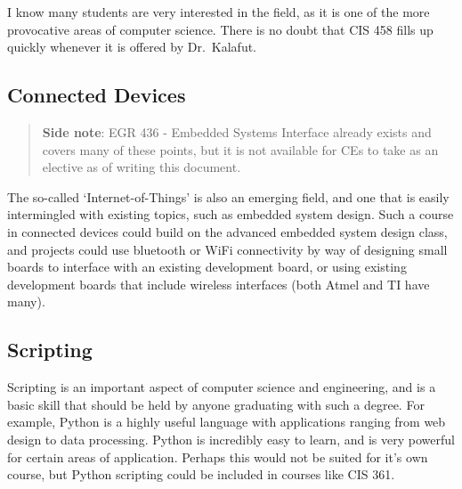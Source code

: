 \documentclass[12pt]{article}
\numberwithin{figure}{section}
\numberwithin{equation}{section}
\begin{document}
{\bigskip

I know many students are very interested in the field, as it is one of
the more provocative areas of computer science. There is no doubt that
CIS 458 fills up quickly whenever it is offered by Dr.~Kalafut.

\subsection{Connected Devices}\label{connected-devices}
\begin{quote}
\textbf{Side note}: EGR 436 - Embedded Systems Interface already
exists and covers many of these points, but it is not available for CEs
to take as an elective as of writing this document.
\end{quote}

The so-called `Internet-of-Things' is also an emerging field, and one
that is easily intermingled with existing topics, such as embedded
system design. Such a course in connected devices could build on the
advanced embedded system design class, and projects could use bluetooth
or WiFi connectivity by way of designing small boards to interface with
an existing development board, or using existing development boards that
include wireless interfaces (both Atmel and TI have many).

\subsection{Scripting}\label{scripting}
Scripting is an important aspect of computer science and engineering,
and is a basic skill that should be held by anyone graduating with such
a degree. For example, Python is a highly useful language with
applications ranging from web design to data processing. Python is
incredibly easy to learn, and is very powerful for certain areas of
application. Perhaps this would not be suited for it's own course, but
Python scripting could be included in courses like CIS 361.

}
\end{document}
